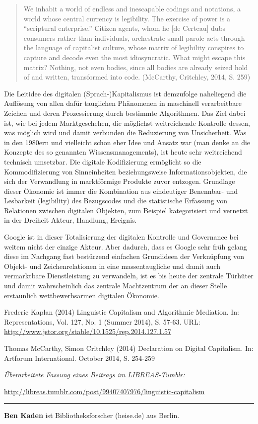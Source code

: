 \documentclass[a4paper,
fontsize=11pt,
oneside,
numbers=noperiodatend,
parskip=half-,
bibliography=totoc,
final
]{scrartcl}
\begin{document}
\begin{quote}
We inhabit a world of endless and inescapable codings and notations, a
world whose central currency is legibility. The exercise of power is a
\enquote{scriptural enterprise.} Citizen agents, whom he {[}de
Certeau{]} dubs consumers rather than individuals, orchestrate small
parole acts through the language of capitalist culture, whose matrix of
legibility conspires to capture and decode even the most idiosyncratic.
What might escape this matrix? Nothing, not even bodies, since all
bodies are already seized hold of and written, transformed into code.
(McCarthy, Critchley, 2014, S. 259)
\end{quote}

Die Leitidee des digitalen (Sprach-)Kapitalismus ist demzufolge
naheliegend die Auflösung von allen dafür tauglichen Phänomenen in
maschinell verarbeitbare Zeichen und deren Prozessierung durch bestimmte
Algorithmen. Das Ziel dabei ist, wie bei jedem Marktgeschehen, die
möglichst weitreichende Kontrolle dessen, was möglich wird und damit
verbunden die Reduzierung von Unsicherheit. Was in den 1980ern und
vielleicht schon eher Idee und Ansatz war (man denke an die Konzepte des
so genannten Wissensmanagements), ist heute sehr weitreichend technisch
umsetzbar. Die digitale Kodifizierung ermöglicht so die Kommodifizierung
von Sinneinheiten beziehungsweise Informationsobjekten, die sich der
Verwandlung in marktförmige Produkte zuvor entzogen. Grundlage dieser
Ökonomie ist immer die Kombination aus eindeutiger Benennbar- und
Lesbarkeit (legibility) des Bezugscodes und die statistische Erfassung
von Relationen zwischen digitalen Objekten, zum Beispiel kategorisiert
und vernetzt in der Dreiheit Akteur, Handlung, Ereignis.

Google ist in dieser Totalisierung der digitalen Kontrolle und
Governance bei weitem nicht der einzige Akteur. Aber dadurch, dass es
Google sehr früh gelang diese im Nachgang fast bestürzend einfachen
Grundideen der Verknüpfung von Objekt- und Zeichenrelationen in eine
massentaugliche und damit auch vermarktbare Dienstleistung zu
verwandeln, ist es bis heute der zentrale Türhüter und damit
wahrscheinlich das zentrale Machtzentrum der an dieser Stelle
erstaunlich wettbewerbsarmen digitalen Ökonomie.

Frederic Kaplan (2014) Linguistic Capitalism and Algorithmic Mediation.
In: Representations, Vol. 127, No. 1 (Summer 2014), S. 57-63. URL:
\url{http://www.jstor.org/stable/10.1525/rep.2014.127.1.57}

Thomas McCarthy, Simon Critchley (2014) Declaration on Digital
Capitalism. In: Artforum International. October 2014, S. 254-259

\emph{Überarbeitete Fassung eines Beitrags im LIBREAS-Tumblr:}

\url{http://libreas.tumblr.com/post/99407407976/linguistic-capitalism}

\begin{center}\rule{0.5\linewidth}{\linethickness}\end{center}

\textbf{Ben Kaden} ist Bibliotheksforscher (heise.de) aus Berlin.

\end{document}
